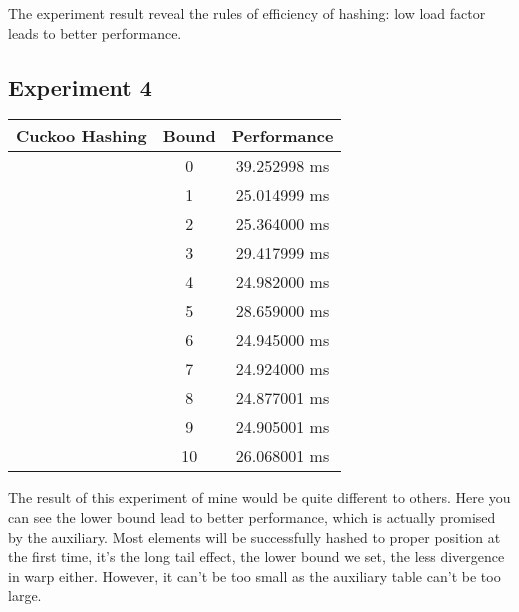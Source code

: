 \documentclass[twoside,11pt]{article}
\begin{document}
The experiment result reveal the rules of efficiency of hashing: low load factor leads to better performance.

\subsection{Experiment 4}

\begin{tabular}{|c|c|c|}
    \hline  
    Cuckoo Hashing  & Bound  &  Performance \\
      \hline  
      & 0  & 39.252998 ms \\
      & 1  & 25.014999 ms \\
      & 2  & 25.364000 ms \\
      & 3  & 29.417999 ms \\
      & 4  & 24.982000 ms \\
      & 5  & 28.659000 ms \\
      & 6  & 24.945000 ms \\
      & 7  & 24.924000 ms \\
      & 8  & 24.877001 ms \\
      & 9  & 24.905001 ms \\
      & 10 & 26.068001 ms \\
      \hline  

  \end{tabular}

The result of this experiment of mine would be quite different to others. Here you can see the lower bound lead to better performance, which is actually promised by the auxiliary. Most elements will be successfully hashed to proper position at the first time, it's the long tail effect, the lower bound we set, the less divergence in warp either. However, it can't be too small as the auxiliary table can't be too large.
\vskip 0.2in
 
\end{document}
